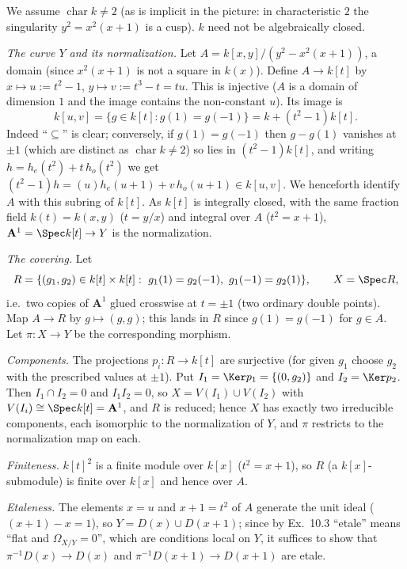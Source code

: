 \documentclass[11pt]{article}
\begin{document}
\pf
We assume $\operatorname{char}k\ne2$ (as is implicit in the picture: in characteristic $2$ the singularity $y^2=x^2(x+1)$ is a cusp). $k$ need not be algebraically closed.

\emph{The curve $Y$ and its normalization.} Let $A=k[x,y]/(y^2-x^2(x+1))$, a domain (since $x^2(x+1)$ is not a square in $k(x)$). Define $A\to k[t]$ by $x\mapsto u:=t^2-1$, $y\mapsto v:=t^3-t=tu$. This is injective ($A$ is a domain of dimension $1$ and the image contains the non-constant $u$). Its image is
\[
k[u,v]=\{g\in k[t]:g(1)=g(-1)\}=k+(t^2-1)k[t].
\]
Indeed ``$\subseteq$'' is clear; conversely, if $g(1)=g(-1)$ then $g-g(1)$ vanishes at $\pm1$ (which are distinct as $\operatorname{char}k\ne2$) so lies in $(t^2-1)k[t]$, and writing $h=h_e(t^2)+t\,h_o(t^2)$ we get $(t^2-1)h=(u)h_e(u+1)+v\,h_o(u+1)\in k[u,v]$. We henceforth identify $A$ with this subring of $k[t]$. As $k[t]$ is integrally closed, with the same fraction field $k(t)=k(x,y)$ ($t=y/x$) and integral over $A$ ($t^2=x+1$), $\mathbf A^1=\Spec k[t]\to Y$ is the normalization.

\emph{The covering.} Let
\[
R=\{(g_1,g_2)\in k[t]\times k[t]:\ g_1(1)=g_2(-1),\ g_1(-1)=g_2(1)\},\qquad X=\Spec R,
\]
i.e.\ two copies of $\mathbf A^1$ glued crosswise at $t=\pm1$ (two ordinary double points). Map $A\to R$ by $g\mapsto(g,g)$; this lands in $R$ since $g(1)=g(-1)$ for $g\in A$. Let $\pi:X\to Y$ be the corresponding morphism.

\emph{Components.} The projections $p_i:R\to k[t]$ are surjective (for given $g_1$ choose $g_2$ with the prescribed values at $\pm1$). Put $I_1=\Ker p_1=\{(0,g_2)\}$ and $I_2=\Ker p_2$. Then $I_1\cap I_2=0$ and $I_1I_2=0$, so $X=V(I_1)\cup V(I_2)$ with $V(I_i)\cong\Spec k[t]=\mathbf A^1$, and $R$ is reduced; hence $X$ has exactly two irreducible components, each isomorphic to the normalization of $Y$, and $\pi$ restricts to the normalization map on each.

\emph{Finiteness.} $k[t]^2$ is a finite module over $k[x]$ ($t^2=x+1$), so $R$ (a $k[x]$-submodule) is finite over $k[x]$ and hence over $A$.

\emph{Etaleness.} The elements $x=u$ and $x+1=t^2$ of $A$ generate the unit ideal ($(x+1)-x=1$), so $Y=D(x)\cup D(x+1)$; since by Ex.~10.3 ``etale'' means ``flat and $\Omega_{X/Y}=0$'', which are conditions local on $Y$, it suffices to show that $\pi^{-1}D(x)\to D(x)$ and $\pi^{-1}D(x+1)\to D(x+1)$ are etale.
\end{document}
